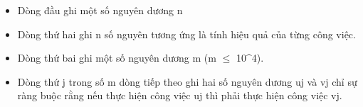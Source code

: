 \begin{itemize}
	\item Dòng đầu ghi một số nguyên dương n
	\item Dòng thứ hai ghi n số nguyên tương ứng là tính hiệu quả của từng công việc.
	\item Dòng thứ bai ghi một số nguyên dương m (m  $\le$  10^4).
	\item Dòng thứ j trong số m dòng tiếp theo ghi hai số nguyên dương uj và vj chỉ sự ràng buộc rằng nếu thực hiện công việc uj thì phải thực hiện công việc vj.
\end{itemize}